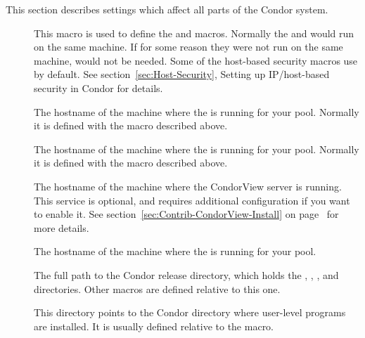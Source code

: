 
This section describes settings which affect all parts of the Condor
system. 
\begin{description}
  
\item[] \label{param:CondorHost} This macro is
  used to define the  and
   macros.  Normally the 
  and  would run on the same machine.  If for some
  reason they were not run on the same machine,
   would not be needed.  Some
  of the host-based security macros use  by
  default.  See section~\ref{sec:Host-Security}, Setting up
  IP/host-based security in Condor for details.
  
\item[] \label{param:CollectorHost} The
  hostname of the machine where the  is running for
  your pool.  Normally it is defined with the
   macro described above.

\item[] \label{param:NegotiatorHost} The
  hostname of the machine where the  is running for
  your pool.  Normally it is defined with the
   macro described above.

\item[] \label{param:CondorViewHost} The
  hostname of the machine where the CondorView server is running.
  This service is optional, and requires additional configuration if
  you want to enable it.
  See section~\ref{sec:Contrib-CondorView-Install} on
  page~\pageref{sec:Contrib-CondorView-Install} for more details.

\item[] \label{param:ScheddHost} The
  hostname of the machine where the  is running for
  your pool.

\item[] \label{param:ReleaseDir} The full path to
  the Condor release directory, which holds the , ,
  , and  directories.
  Other macros are defined relative to this one.

\item[] \label{param:Bin} This directory points to the
  Condor directory where user-level programs are installed.  It
  is usually defined relative to the  macro.
  

\end{description}
